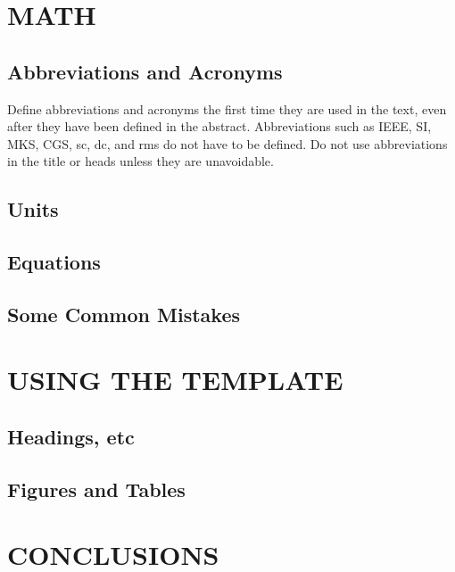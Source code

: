 \documentclass[letterpaper, 10 pt, conference]{ieeeconf}  %
\begin{document}
\section{MATH}


\subsection{Abbreviations and Acronyms} Define abbreviations and acronyms the first time they are used in the text, even after they have been defined in the abstract. Abbreviations such as IEEE, SI, MKS, CGS, sc, dc, and rms do not have to be defined. Do not use abbreviations in the title or heads unless they are unavoidable.

\subsection{Units}




\subsection{Equations}



\subsection{Some Common Mistakes}



\section{USING THE TEMPLATE}


\subsection{Headings, etc}



\subsection{Figures and Tables}



\section{CONCLUSIONS}



\end{document}
